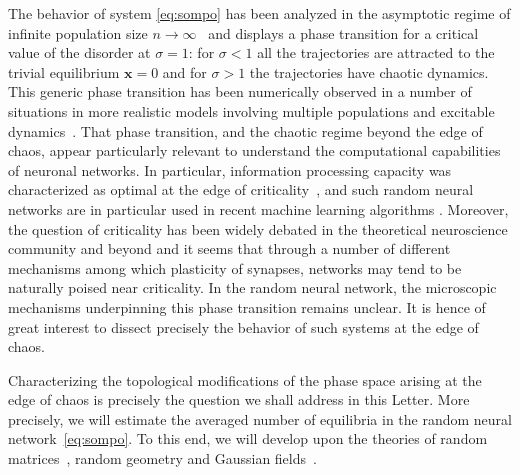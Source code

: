 The behavior of system \eqref{eq:sompo} has been analyzed in the asymptotic regime of infinite population size $n\to \infty$~\cite{sompolinsky-crisanti-etal:88} and displays a phase transition for a critical value of the disorder at $\sigma=1$: for $\sigma<1$ all the trajectories are attracted to the trivial equilibrium ${\mathbf{x}}=0$ and for $\sigma>1$ the trajectories have chaotic dynamics. This generic phase transition has been numerically observed in a number of situations in more realistic models involving multiple populations and excitable dynamics~\cite{hermann-touboul:12}. That phase transition, and the chaotic regime beyond the edge of chaos, appear particularly relevant to understand the computational capabilities of neuronal networks. In particular, information processing capacity was characterized as optimal at the edge of criticality~\cite{abbott-toyoizumi:11, sussillo-abbott:09}, and such random neural networks are in particular used in recent machine learning algorithms \cite{jaeger:04}. Moreover, the question of criticality has been widely debated in the theoretical neuroscience community and beyond \cite{bak:96, beggs:08, kitzbichler:09} and it seems that through a number of different mechanisms among which plasticity of synapses, networks may tend to be naturally poised near criticality. In the random neural network, the microscopic mechanisms underpinning this phase transition remains unclear.
It is hence of great interest to dissect precisely the behavior of such systems at the edge of chaos. 

Characterizing the topological modifications of the phase space arising at the edge of chaos is precisely the question we shall address in this Letter. More precisely, we will estimate the averaged number of equilibria in the random neural network~\eqref{eq:sompo}.
To this end, we will develop upon the theories of random matrices~\cite{tao2012topics}, random geometry and Gaussian fields~\cite{adler-taylor:07}. 

